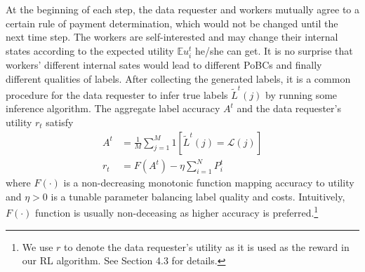  
At the beginning of each step, the data requester and workers mutually agree to a certain rule of payment determination, which would not be changed until the next time step.
The workers are self-interested and may change their internal states according to the expected utility $\mathbb{E}u_i^t$ he/she can get. It is no surprise that workers' different internal sates would lead to different PoBCs and finally different qualities of labels. After collecting the generated labels, it is a common procedure for the data requester to infer true labels $\tilde{L}^t(j)$ by running some inference algorithm.
The aggregate label accuracy $A^t$ and the data requester's utility $r_t$ satisfy
\begin{equation}
\label{equation:utility}
\begin{split}
A^t&=\frac{1}{M}{\sum}_{j=1}^{M}1\left[\tilde{L}^{t}(j)=\mathcal{L}(j)\right]\\
r_t &= F(A^t) - \eta {\sum}_{i=1}^{N}P^t_i
\end{split}
\end{equation}
where $F(\cdot)$ is a non-decreasing monotonic function mapping accuracy to utility and $\eta>0$ is a tunable parameter balancing label quality and costs. Intuitively, $F(\cdot)$ function is usually non-deceasing as higher accuracy is preferred.\footnote{We use $r$ to denote the data requester's utility as it is used as the reward in our RL algorithm. See Section 4.3 for details.} 

